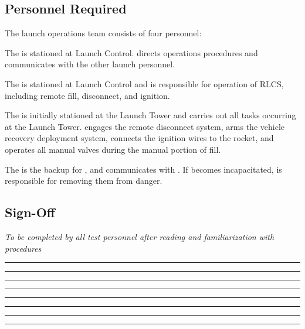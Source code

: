 \subsection{Personnel Required}
The launch operations team consists of four personnel:
\begin{checklist}
    \item The \opsfull{} is stationed at Launch Control. \ops{} directs operations procedures and communicates with the other launch personnel.
    \item The \controlfull{} is stationed at Launch Control and is responsible for operation of RLCS, including remote fill, disconnect, and ignition.
    \item The \primaryfull{} is initially stationed at the Launch Tower and carries out all tasks occurring at the Launch Tower. \primary{} engages the remote disconnect system, arms the vehicle recovery deployment system, connects the ignition wires to the rocket, and operates all manual valves during the manual portion of fill.
    \item The \secondaryfull{} is the backup for \primary{}, and communicates with \ops{}. If \primary{} becomes incapacitated, \secondary{} is responsible for removing them from danger.
\end{checklist}
\setcounter{checklistnum}{0}

\subsection{Sign-Off}
\textit{To be completed by all test personnel after reading and familiarization with procedures}
\begin{checklist}
    \item \opsfull      \tabto{25em}\rule{10em}{0.4pt}\hspace{5em}\rule{10em}{0.4pt}
    \item \controlfull      \tabto{25em}\rule{10em}{0.4pt}\hspace{5em}\rule{10em}{0.4pt}
    \item \primaryfull  \tabto{25em}\rule{10em}{0.4pt}\hspace{5em}\rule{10em}{0.4pt}
    \item \secondaryfull\tabto{25em}\rule{10em}{0.4pt}\hspace{5em}\rule{10em}{0.4pt}
\end{checklist}
\setcounter{checklistnum}{0}
\newpage{}

